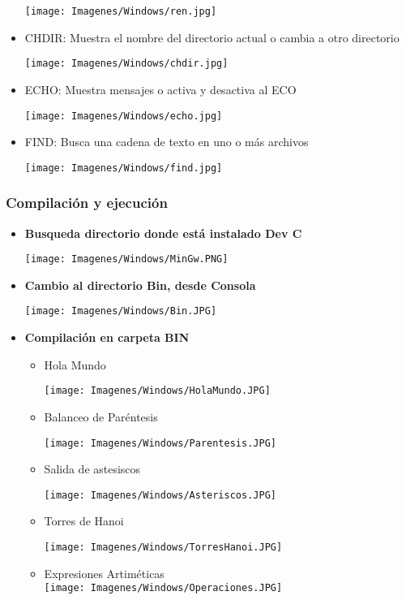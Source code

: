 \documentclass[12pt]{article}
\begin{document}
\begin{itemize}
				\texttt{[image: Imagenes/Windows/ren.jpg]}	
			\item CHDIR: Muestra el nombre del directorio actual o cambia a otro directorio
			
				\texttt{[image: Imagenes/Windows/chdir.jpg]}
				\\
			\item ECHO: Muestra mensajes o activa y desactiva al ECO
			
				\texttt{[image: Imagenes/Windows/echo.jpg]}
				
			\item FIND: Busca una cadena de texto en uno o más archivos
			
				\texttt{[image: Imagenes/Windows/find.jpg]}	
		\end{itemize}
\newpage	
\subsubsection{Compilación y ejecución}

\begin{itemize}
    \item \textbf{Busqueda directorio donde está instalado Dev C }
    
    \texttt{[image: Imagenes/Windows/MinGw.PNG]}
    
    \item \textbf{Cambio al directorio Bin, desde Consola}
 
     \texttt{[image: Imagenes/Windows/Bin.JPG]}
     \newpage
    \item \textbf{Compilación en carpeta BIN}
    
    \begin{itemize}
                \item Hola Mundo
                
                   \texttt{[image: Imagenes/Windows/HolaMundo.JPG]}
                   
                \item Balanceo de Paréntesis
                
                \texttt{[image: Imagenes/Windows/Parentesis.JPG]}
                \newpage
                \item Salida de astesiscos
                
                \texttt{[image: Imagenes/Windows/Asteriscos.JPG]}

                \item Torres de Hanoi
                
                \texttt{[image: Imagenes/Windows/TorresHanoi.JPG]}
                \newpage
                \item Expresiones Artiméticas\\
                \texttt{[image: Imagenes/Windows/Operaciones.JPG]}
                    
            \end{itemize}
    
\end{itemize}
\newpage    
\end{document}
